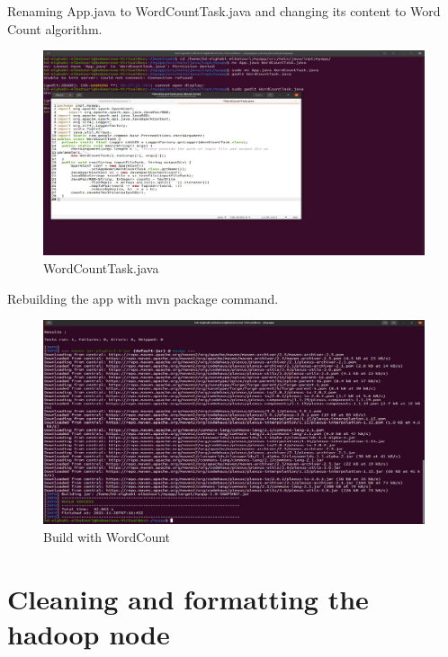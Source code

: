\begin{spacing}{1.2}
\par Renaming App.java to WordCountTask.java and changing its content to Word Count algorithm.
\\
\begin{figure}[!htb] 
\begin{center} 
\includegraphics[width=1\linewidth]{Big_Data/Spark/Running a Spark Batch app in Java/WordCountTask.java} 
\end{center} 
\caption{WordCountTask.java} 
\end{figure} 
\FloatBarrier

\par Rebuilding the app with mvn package command.
\\
\begin{figure}[!htb] 
\begin{center} 
\includegraphics[width=1\linewidth]{Big_Data/Spark/Running a Spark Batch app in Java/Build with WordCount} 
\end{center} 
\caption{Build with WordCount} 
\end{figure} 
\FloatBarrie

\section{Cleaning and formatting the hadoop node}


\end{spacing}
